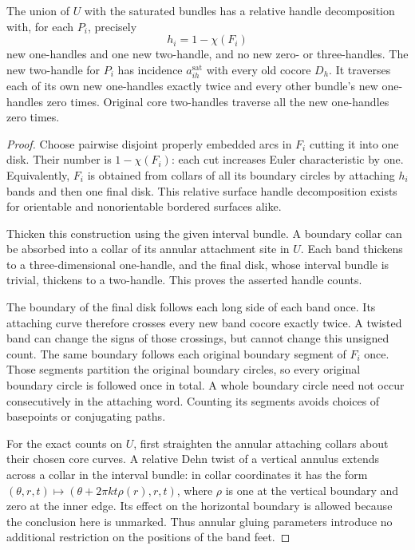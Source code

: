 \begin{lemma}
\label{lem:saturated-relative-handles}
The union of $U$ with the saturated bundles has a relative handle
decomposition with, for each $P_i$, precisely
\[
 h_i=1-\chi(F_i)
\]
new one-handles and one new two-handle, and no new zero- or three-handles.
The new two-handle for $P_i$ has incidence
$a_{ih}^{\mathrm{sat}}$ with every old cocore $D_h$.  It traverses each
of its own new one-handles exactly twice and every other bundle's new
one-handles zero times.  Original core two-handles traverse all the new
one-handles zero times.
\end{lemma}

\begin{proof}
Choose pairwise disjoint properly embedded arcs in $F_i$ cutting it into
one disk.  Their number is $1-\chi(F_i)$: each cut increases Euler
characteristic by one.  Equivalently, $F_i$ is obtained from collars of
all its boundary circles by attaching $h_i$ bands and then one final
disk.  This relative surface handle decomposition exists for orientable
and nonorientable bordered surfaces alike.

Thicken this construction using the given interval bundle.  A boundary
collar can be absorbed into a collar of its annular attachment site in
$U$.  Each band thickens to a three-dimensional one-handle, and the
final disk, whose interval bundle is trivial, thickens to a two-handle.
This proves the asserted handle counts.

The boundary of the final disk follows each long side of each band once.
Its attaching curve therefore crosses every new band cocore exactly
twice.  A twisted band can change the signs of those crossings, but
cannot change this unsigned count.  The same boundary follows each
original boundary segment of $F_i$ once.  Those segments partition the
original boundary circles, so every original boundary circle is followed
once in total.  A whole boundary circle need not occur consecutively in
the attaching word.  Counting its segments avoids choices of basepoints
or conjugating paths.

For the exact counts on $U$, first straighten the annular attaching
collars about their chosen core curves. A relative Dehn twist of a
vertical annulus extends across a collar in the interval bundle: in
collar coordinates it has the form
$(\theta,r,t)\mapsto(\theta+2\pi k t\rho(r),r,t)$, where $\rho$ is one
at the vertical boundary and zero at the inner edge. Its effect on
the horizontal boundary is allowed because the conclusion here is
unmarked. Thus annular gluing parameters introduce no additional
restriction on the positions of the band feet.


\end{proof}
